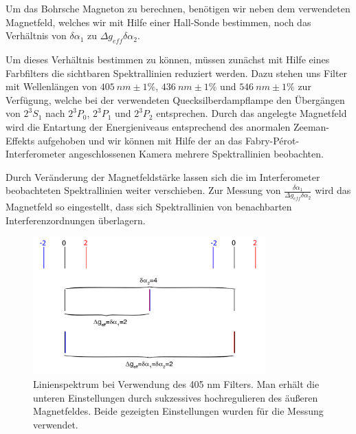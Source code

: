 \documentclass[bigchapter,colorback,accentcolor=tud4b,linedtoc,11pt]{tudreport}
\begin{document}
Um das Bohrsche Magneton zu berechnen, benötigen wir neben dem verwendeten
Magnetfeld, welches wir mit Hilfe einer Hall-Sonde bestimmen, noch das
Verhältnis von $\delta\alpha_1$ zu $\Delta g_{eff} \delta\alpha_2$.

Um dieses Verhältnis bestimmen zu können, müssen zunächst mit Hilfe eines
Farbfilters die sichtbaren Spektrallinien reduziert werden. Dazu stehen uns Filter
mit Wellenlängen von $405 ~nm \pm 1\%$, $436 ~nm \pm 1\%$ und $546 ~nm \pm 1\%$
zur Verfügung, welche bei der verwendeten Quecksilberdampflampe den Übergängen von
$2^3S_1$ nach $2^3P_0$, $2^3P_1$ und $2^3P_2$ entsprechen. Durch das angelegte
Magnetfeld wird die Entartung der Energieniveaus entsprechend des anormalen
Zeeman-Effekts aufgehoben und wir können mit Hilfe der an das
Fabry-Pérot-Interferometer angeschlossenen Kamera mehrere
Spektrallinien beobachten.

Durch Veränderung der Magnetfeldstärke lassen sich die im Interferometer
beobachteten Spektrallinien weiter verschieben. Zur Messung von
$\frac{\delta\alpha_1}{\Delta g_{eff} \delta\alpha_2}$ wird das Magnetfeld so
eingestellt, dass sich Spektrallinien von benachbarten Interferenzordnungen
überlagern. 

\begin{figure}[H] 
  \centering
     \includegraphics[width=0.8\textwidth]{img/linienspektrum405.png}
  \caption{Linienspektrum bei Verwendung des 405 nm Filters. Man erhält die
    unteren Einstellungen durch sukzessives hochregulieren des äußeren Magnetfeldes. Beide gezeigten
    Einstellungen wurden für die Messung verwendet.}
  \label{fig:405nmlines}
\end{figure}
\end{document}
